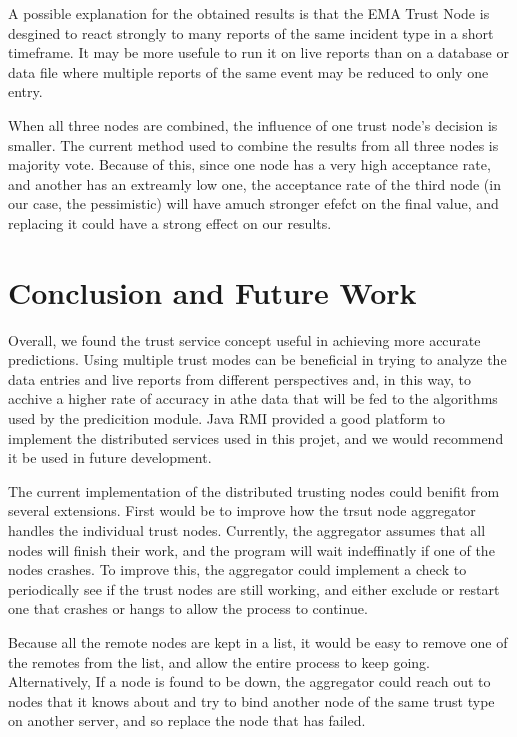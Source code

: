 \documentclass[11pt]{article}
\begin{document}
A possible explanation for the obtained results is that the EMA Trust Node is desgined to react strongly to many reports of the same incident type in a short timeframe. It may be more usefule to run it on live reports than on a database or data file where multiple reports of the same event may be reduced to only one entry.

When all three nodes are combined, the influence of one trust node's decision is smaller. The current method used to combine the results from all three nodes is majority vote. Because of this, since one node has a very high acceptance rate, and another has an extreamly low one, the acceptance rate of the third node (in our case, the pessimistic) will have amuch stronger efefct on the final value, and replacing it could have a strong effect on our results.

\section{Conclusion and Future Work}

Overall, we found the trust service concept useful in achieving more accurate predictions. Using multiple trust modes can be beneficial in trying to analyze the data entries and live reports from different perspectives and, in this way, to acchive a higher rate of accuracy in athe data that will be fed to the algorithms used by the predicition module. Java RMI provided a good platform to implement the distributed services used in this projet, and we would recommend it be used in future development.

The current implementation of the distributed trusting nodes could benifit from several extensions. First would be to improve how the trsut node aggregator handles the individual trust nodes. Currently, the aggregator assumes that all nodes will finish their work, and the program will wait indeffinatly if one of the nodes crashes. To improve this, the aggregator could implement a check to periodically see if the trust nodes are still working, and either exclude or restart one that crashes or hangs to allow the process to continue.

Because all the remote nodes are kept in a list, it would be easy to remove one of the remotes from the list, and allow the entire process to keep going. Alternatively, If a node is found to be down, the aggregator could reach out to nodes that it knows about and try to bind another node of the same trust type on another server, and so replace the node that has failed.
\end{document}
